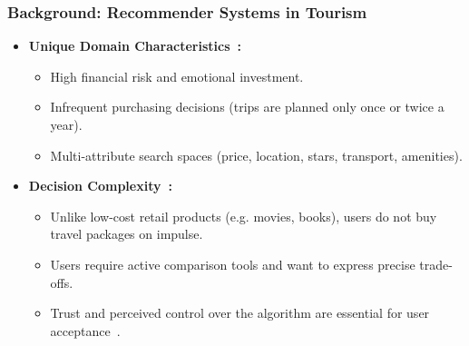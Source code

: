 \begin{frame}
    \frametitle{Background: Recommender Systems in Tourism}
    \begin{itemize}
        \item \textbf{Unique Domain Characteristics~\cite{ricci2011travel, BORRAS20147370}:}
            \begin{itemize}
                \item High financial risk and emotional investment.
                \item Infrequent purchasing decisions (trips are planned only once or twice a year).
                \item Multi-attribute search spaces (price, location, stars, transport, amenities).
            \end{itemize}
        \item \textbf{Decision Complexity~\cite{ricci2011travel, BORRAS20147370}:}
            \begin{itemize}
                \item Unlike low-cost retail products (e.g. movies, books), users do not buy travel packages on impulse.
                \item Users require active comparison tools and want to express precise trade-offs.
                \item Trust and perceived control over the algorithm are essential for user acceptance~\cite{knijnenburg2012explaining}.
            \end{itemize}
    \end{itemize}
\end{frame}

